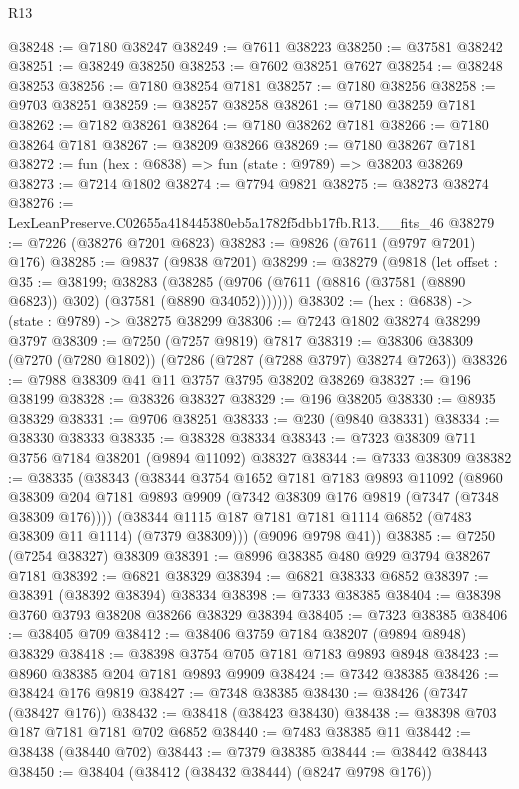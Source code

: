 \begin{lexlean}{R13}
\begin{coremodule}
@38248 := @7180 @38247
@38249 := @7611 @38223
@38250 := @37581 @38242
@38251 := @38249 @38250
@38253 := @7602 @38251 @7627
@38254 := @38248 @38253
@38256 := @7180 @38254 @7181
@38257 := @7180 @38256
@38258 := @9703 @38251
@38259 := @38257 @38258
@38261 := @7180 @38259 @7181
@38262 := @7182 @38261
@38264 := @7180 @38262 @7181
@38266 := @7180 @38264 @7181
@38267 := @38209 @38266
@38269 := @7180 @38267 @7181
@38272 := fun (hex : @6838) => fun (state : @9789) => @38203 @38269
@38273 := @7214 @1802
@38274 := @7794 @9821
@38275 := @38273 @38274
@38276 := LexLeanPreserve.C02655a418445380eb5a1782f5dbb17fb.R13.__fits_46
@38279 := @7226 (@38276 @7201 @6823)
@38283 := @9826 (@7611 (@9797 @7201) @176)
@38285 := @9837 (@9838 @7201)
@38299 := @38279
    (@9818
      (let offset : @35 := @38199;
      @38283 (@38285 (@9706 (@7611 (@8816 (@37581 (@8890 @6823)) @302) (@37581 (@8890 @34052)))))))
@38302 := (hex : @6838) -> (state : @9789) -> @38275 @38299
@38306 := @7243 @1802 @38274 @38299 @3797
@38309 := @7250 (@7257 @9819) @7817
@38319 := @38306 @38309 (@7270 (@7280 @1802)) (@7286 (@7287 (@7288 @3797) @38274 @7263))
@38326 := @7988 @38309 @41 @11 @3757 @3795 @38202 @38269
@38327 := @196 @38199
@38328 := @38326 @38327
@38329 := @196 @38205
@38330 := @8935 @38329
@38331 := @9706 @38251
@38333 := @230 (@9840 @38331)
@38334 := @38330 @38333
@38335 := @38328 @38334
@38343 := @7323 @38309 @711 @3756 @7184 @38201 (@9894 @11092) @38327
@38344 := @7333 @38309
@38382 := @38335
    (@38343
      (@38344
        @3754
        @1652
        @7181
        @7183
        @9893
        @11092
        (@8960 @38309 @204 @7181 @9893 @9909 (@7342 @38309 @176 @9819 (@7347 (@7348 @38309 @176))))
        (@38344 @1115 @187 @7181 @7181 @1114 @6852 (@7483 @38309 @11 @1114) (@7379 @38309)))
      (@9096 @9798 @41))
@38385 := @7250 (@7254 @38327) @38309
@38391 := @8996 @38385 @480 @929 @3794 @38267 @7181
@38392 := @6821 @38329
@38394 := @6821 @38333 @6852
@38397 := @38391 (@38392 @38394) @38334
@38398 := @7333 @38385
@38404 := @38398 @3760 @3793 @38208 @38266 @38329 @38394
@38405 := @7323 @38385
@38406 := @38405 @709
@38412 := @38406 @3759 @7184 @38207 (@9894 @8948) @38329
@38418 := @38398 @3754 @705 @7181 @7183 @9893 @8948
@38423 := @8960 @38385 @204 @7181 @9893 @9909
@38424 := @7342 @38385
@38426 := @38424 @176 @9819
@38427 := @7348 @38385
@38430 := @38426 (@7347 (@38427 @176))
@38432 := @38418 (@38423 @38430)
@38438 := @38398 @703 @187 @7181 @7181 @702 @6852
@38440 := @7483 @38385 @11
@38442 := @38438 (@38440 @702)
@38443 := @7379 @38385
@38444 := @38442 @38443
@38450 := @38404 (@38412 (@38432 @38444) (@8247 @9798 @176))

\end{coremodule}
\end{lexlean}
